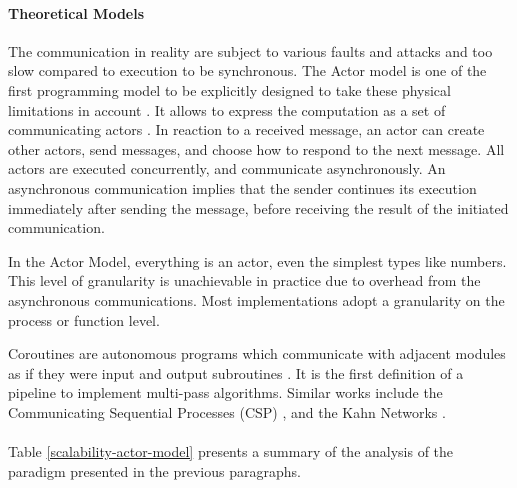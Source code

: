 \paragraph{Theoretical Models}

The communication in reality are subject to various faults and attacks \cite{Lamport1982} and too slow compared to execution to be synchronous.
The Actor model is one of the first programming model to be explicitly designed to take these physical limitations in account \cite{Hewitt1977a}.
It allows to express the computation as a set of communicating actors \cite{Hewitt1973a, Hewitt1977, Clinger1981}.
In reaction to a received message, an actor can create other actors, send messages, and choose how to respond to the next message.
All actors are executed concurrently, and communicate asynchronously.
An asynchronous communication implies that the sender continues its execution immediately after sending the message, before receiving the result of the initiated communication.

In the Actor Model, everything is an actor, even the simplest types like numbers.
This level of granularity is unachievable in practice due to overhead from the asynchronous communications.
Most implementations adopt a granularity on the process or function level.

Coroutines are autonomous programs which communicate with adjacent modules as if they were input and output subroutines \cite{Conway1963}.
It is the first definition of a pipeline to implement multi-pass algorithms.
Similar works include the Communicating Sequential Processes (CSP) \cite{Hoare1978, Brookes1984}, and the Kahn Networks \cite{Kahn1974, Kahn1976}.


\paragraph{}

Table \ref{scalability-actor-model} presents a summary of the analysis of the paradigm presented in the previous paragraphs.

